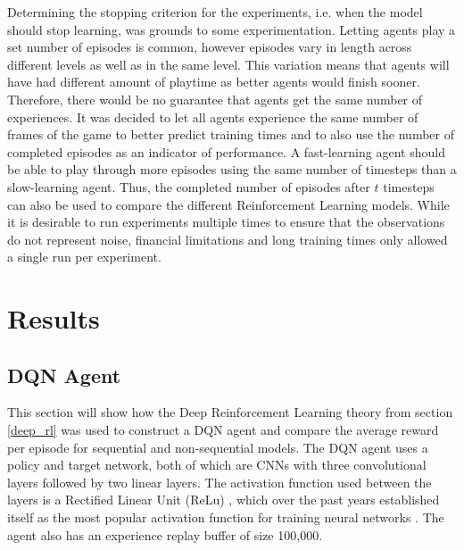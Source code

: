 \documentclass[notitlepage,a4paper,11pt]{article}
\begin{document}
Determining the stopping criterion for the experiments, i.e. when the model should stop learning, was grounds to some experimentation. Letting agents play a set number of episodes is common, however episodes vary in length across different levels as well as in the same level. This variation means that agents will have had different amount of playtime as better agents would finish sooner. Therefore, there would be no guarantee that agents get the same number of experiences. It was decided to let all agents experience the same number of frames of the game to better predict training times and to also use the number of completed episodes as an indicator of performance. A fast-learning agent should be able to play through more episodes using the same number of timesteps than a slow-learning agent. Thus, the completed number of episodes after $t$ timesteps can also be used to compare the different Reinforcement Learning models. While it is desirable to run experiments multiple times to ensure that the observations do not represent noise, financial limitations and long training times only allowed a single run per experiment. 



\section{Results}

\subsection{DQN Agent}\label{dqn_experiment}
This section will show how the Deep Reinforcement Learning theory from section \ref{deep_rl} was used to construct a DQN agent and compare the average reward per episode for sequential and non-sequential models. The DQN agent uses a policy and target network, both of which are CNNs with three convolutional layers followed by two linear layers. The activation function used between the layers is a Rectified Linear Unit (ReLu) \cite{lecun2015deep}, which over the past years established itself as the most popular activation function for training neural networks \cite{ramachandran2017searching}. The agent also has an experience replay buffer of size 100,000. 
\end{document}
